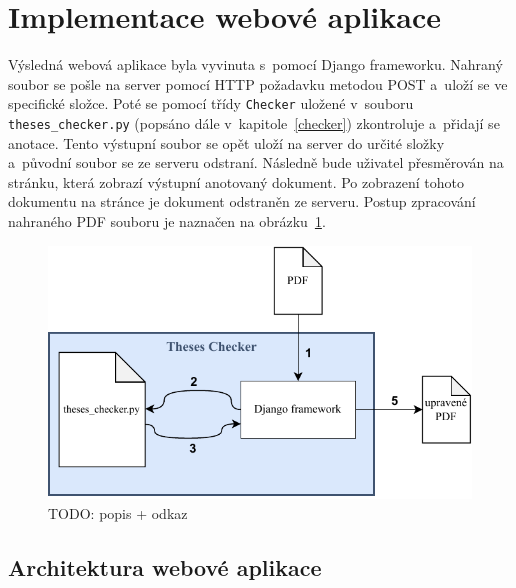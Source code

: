 \section{Implementace webové aplikace} \label{web_app}
Výsledná webová aplikace byla vyvinuta s~pomocí Django frameworku.
Nahraný soubor se pošle na server pomocí HTTP požadavku metodou POST
a~uloží se ve specifické složce. Poté se pomocí třídy \texttt{Checker}
uložené v~souboru \texttt{theses\_checker.py} (popsáno dále
v~kapitole~\ref{checker}) zkontroluje a~přidají se anotace.
Tento výstupní soubor se opět uloží na server do určité složky a~původní soubor
se ze serveru odstraní. Následně bude uživatel přesměrován na stránku, která
zobrazí výstupní anotovaný dokument. Po zobrazení tohoto dokumentu na stránce je
dokument odstraněn ze serveru. Postup zpracování nahraného PDF souboru je
naznačen na obrázku~\ref{pic_communication}.

\begin{figure}[H]
    \centering
    \includegraphics[width=0.8\linewidth]{obrazky-figures/Theses_Checker_communication.pdf}
    \caption{TODO: popis + odkaz}
    \label{pic_communication}
\end{figure}


\subsection*{Architektura webové aplikace}


\dummyText[2]


